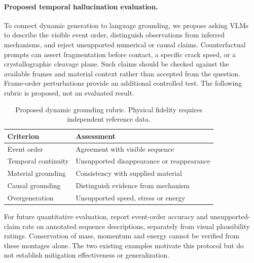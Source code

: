 \documentclass[11pt]{article}
\begin{document}
\paragraph{Proposed temporal hallucination evaluation.} To connect dynamic generation to language grounding, we propose asking VLMs to describe the visible event order, distinguish observations from inferred mechanisms, and reject unsupported numerical or causal claims. Counterfactual prompts can assert fragmentation before contact, a specific crack speed, or a crystallographic cleavage plane. Such claims should be checked against the available frames and material context rather than accepted from the question. Frame-order perturbations provide an additional controlled test. The following rubric is proposed, not an evaluated result.
\begin{table}[t]
\small\centering
\begin{tabularx}{\columnwidth}{lX}\toprule
Criterion & Assessment \\\midrule
Event order & Agreement with visible sequence \\
Temporal continuity & Unsupported disappearance or reappearance \\
Material grounding & Consistency with supplied material \\
Causal grounding & Distinguish evidence from mechanism \\
Overgeneration & Unsupported speed, stress or energy \\
\bottomrule\end{tabularx}
\caption{Proposed dynamic grounding rubric. Physical fidelity requires independent reference data.}
\label{tab:dynamic}
\end{table}
For future quantitative evaluation, report event-order accuracy and unsupported-claim rate on annotated sequence descriptions, separately from visual plausibility ratings. Conservation of mass, momentum and energy cannot be verified from these montages alone. The two existing examples motivate this protocol but do not establish mitigation effectiveness or generalization.
\end{document}
